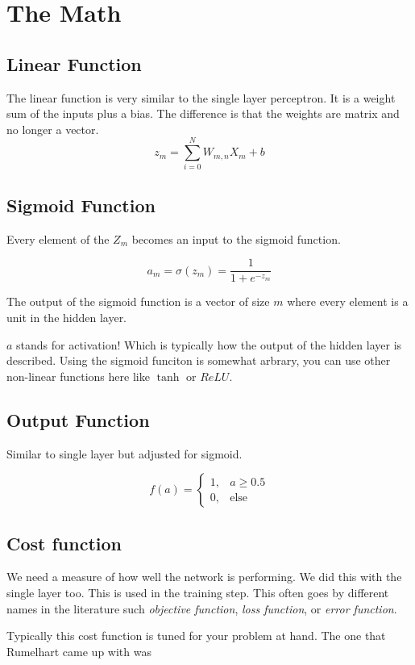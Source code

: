 \documentclass[letterpaper,12pt]{article}
\begin{document}
\section{The Math}

\subsection{Linear Function}
The linear function is very similar to the single layer perceptron. It is a
weight sum of the inputs plus a bias. The difference is that the weights are
matrix and no longer a vector.
\[
    z_m = \sum_{i=0}^{N} W_{m,n} X_m + b
\]

\subsection{Sigmoid Function}
Every element of the $Z_m$ becomes an input to the sigmoid function.

\[
    a_m = \sigma(z_m) = \frac{1}{1 + e^{-z_m}}
\]

The output of the sigmoid function is a vector of size $m$ where every element
is a unit in the hidden layer.

$a$ stands for activation! Which is typically how the output of the hidden layer
is described. Using the sigmoid funciton is somewhat arbrary, you can use other
non-linear functions here like $\tanh$ or $ReLU$.

\subsection{Output Function}

Similar to single layer but adjusted for sigmoid.

\[
    f(a) =
    \begin{cases}
        1, & a \ge 0.5\\
        0, & \text{else}
    \end{cases}
\]

\subsection{Cost function}

We need a measure of how well the network is performing. We did this with the
single layer too. This is used in the training step. This often goes by
different names in the literature such \emph{objective function}, \emph{loss
function}, or \emph{error function}.

Typically this cost function is tuned for your problem at hand. The one that
Rumelhart came up with was
\end{document}
